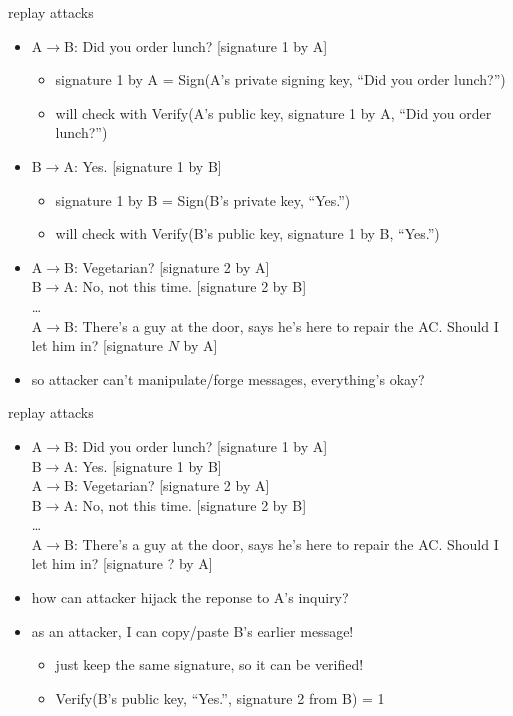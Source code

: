 \begin{frame}{replay attacks}
    \begin{itemize}
    \item A$\rightarrow$B: Did you order lunch? [signature 1 by A]
        \begin{itemize}
            \item signature 1 by A = Sign(A's private signing key, ``Did you order lunch?'')
            \item will check with Verify(A's public key, signature 1 by A, ``Did you order lunch?'')
        \end{itemize}
    \item B$\rightarrow$A: Yes. [signature 1 by B]  
        \begin{itemize}
            \item signature 1 by B = Sign(B's private key, ``Yes.'')
            \item will check with Verify(B's public key, signature 1 by B, ``Yes.'')
        \end{itemize}
    \item  A$\rightarrow$B: Vegetarian? [signature 2 by A]  \\
     B$\rightarrow$A: No, not this time. [signature 2 by B]  \\ \ldots \\
     A$\rightarrow$B: There's a guy at the door, says he's here to repair the AC. Should I let him in? [signature $N$ by A]
    \vspace{.5cm}
    \item so attacker can't manipulate/forge messages, everything's okay?
    \end{itemize}
\end{frame}

\begin{frame}{replay attacks}
    \begin{itemize}
    \item A$\rightarrow$B: Did you order lunch? [signature 1 by A] \\
          B$\rightarrow$A: Yes. [signature 1 by B]  \\
          A$\rightarrow$B: Vegetarian? [signature 2 by A] \\
          B$\rightarrow$A: No, not this time. [signature 2 by B] \\
          \ldots \\
          A$\rightarrow$B: There's a guy at the door, says he's here to repair the AC. Should I let him in? [signature ? by A]
    \item how can attacker hijack the reponse to A's inquiry?
    \vspace{.5cm}
    \item<2-> as an attacker, I can copy/paste B's earlier message!
        \begin{itemize}
        \item just keep the same signature, so it can be verified!
        \item Verify(B's public key, ``Yes.'', signature 2 from B) = 1
        \end{itemize}
    \end{itemize}
\end{frame}


